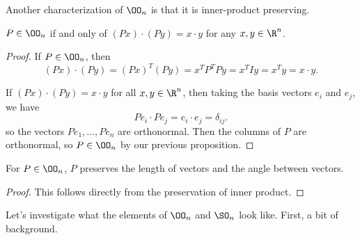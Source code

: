 \documentclass[a4]{scrreprt}
\begin{document}
Another characterization of $\OO_n$ is that it is inner-product preserving.

\begin{proposition}
	$P \in \OO_n$ if and only of $(Px) \cdot (Py) = x \cdot y$ for any $x, y \in \R^n$.
\end{proposition}
\begin{proof}
	If $P \in \OO_n$, then 
	$$
	(Px) \cdot (Py) = (Px)^T (Py) = x^T P^T P y = x^T I y = x^Ty = x \cdot y.
	$$

	If $(Px) \cdot (Py) = x \cdot y$ for all $x, y \in \R^n$, then taking the basis vectors $e_i$ and $e_j$, we have
	$$
	Pe_i \cdot Pe_j = e_i \cdot e_j = \delta_{ij}.
	$$
	so the vectors $Pe_1,\dots, Pe_n$ are orthonormal. Then the columns of $P$ are orthonormal, so $P \in \OO_n$ by our previous proposition. 
\end{proof}

\begin{corollary}
	For $P \in \OO_n$, $P$ preserves the length of vectors and the angle between vectors.
\end{corollary}
\begin{proof}
	This follows directly from the preservation of inner product.
\end{proof}

Let's investigate what the elements of $\OO_n$ and $\SO_n$ look like. First, a bit of background.
\end{document}
